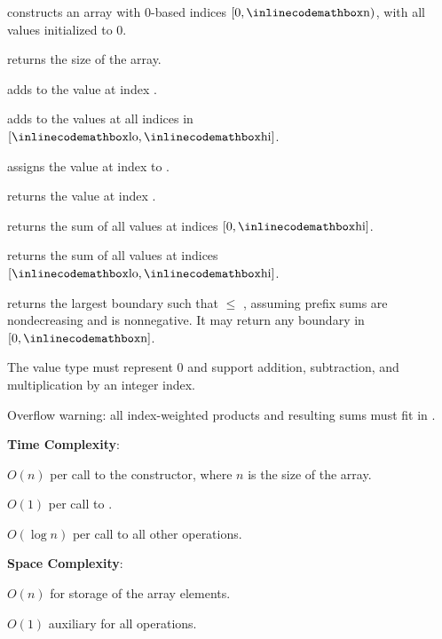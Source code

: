 \begin{compactitem}
  \item {} constructs an array with 0-based indices $[0, {\inlinecodemath{n}})$, with all values initialized to $0$.
  \item {} returns the size of the array.
  \item {} adds  to the value at index .
  \item {} adds  to the values at all indices in $[{\inlinecodemath{lo}}, {\inlinecodemath{hi}}]$.
  \item {} assigns the value at index  to .
  \item {} returns the value at index .
  \item {} returns the sum of all values at indices $[0, {\inlinecodemath{hi}}]$.
  \item {} returns the sum of all values at indices $[{\inlinecodemath{lo}}, {\inlinecodemath{hi}}]$.
  \item {} returns the largest boundary  such that  $\leq$ , assuming prefix sums are nondecreasing and  is nonnegative. It may return any boundary in $[0, {\inlinecodemath{n}}]$.
\end{compactitem}

The value type  must represent $0$ and support addition, subtraction, and multiplication by an integer index.

Overflow warning: all index-weighted products and resulting sums must fit in .

\textbf{Time Complexity}:
\begin{compactitem}
  \item $O(n)$ per call to the constructor, where $n$ is the size of the array.
  \item $O(1)$ per call to .
  \item $O(\log n)$ per call to all other operations.
\end{compactitem}

\textbf{Space Complexity}:
\begin{compactitem}
  \item $O(n)$ for storage of the array elements.
  \item $O(1)$ auxiliary for all operations.
\end{compactitem}

